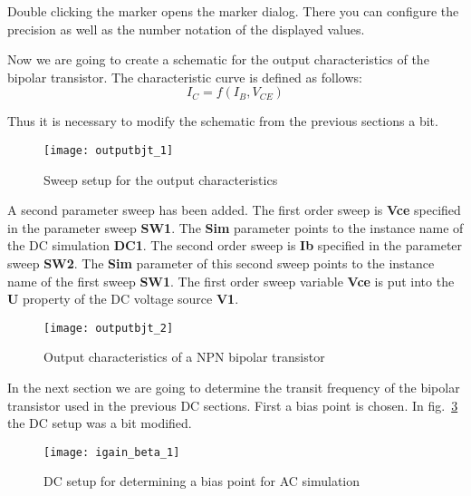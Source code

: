 Double clicking the marker opens the marker dialog.  There you can
configure the precision as well as the number notation of the
displayed values.


Now we are going to create a schematic for the output characteristics
of the bipolar transistor.  The characteristic curve is defined as
follows:
\begin{equation*}
I_{C} = f\left(I_B, V_{CE}\right)
\end{equation*}

Thus it is necessary to modify the schematic from the previous
sections a bit.

\begin{figure}[ht]
  \centering
  \texttt{[image: outputbjt\_1]}
  \caption{Sweep setup for the output characteristics}
  \label{fig:outputbjt_1}
\end{figure}
\FloatBarrier

A second parameter sweep has been added.  The first order sweep is
\textbf{Vce} specified in the parameter sweep \textbf{SW1}.  The
\textbf{Sim} parameter points to the instance name of the DC
simulation \textbf{DC1}.  The second order sweep is \textbf{Ib}
specified in the parameter sweep \textbf{SW2}. The \textbf{Sim}
parameter of this second sweep points to the instance name of the
first sweep \textbf{SW1}.  The first order sweep variable \textbf{Vce}
is put into the \textbf{U} property of the DC voltage source
\textbf{V1}.

\begin{figure}[ht]
  \centering
  \texttt{[image: outputbjt\_2]}
  \caption{Output characteristics of a NPN bipolar transistor}
  \label{fig:outputbjt_2}
\end{figure}
\FloatBarrier


In the next section we are going to determine the transit frequency of
the bipolar transistor used in the previous DC sections.  First a bias
point is chosen.  In fig.~\ref{fig:igain_beta_1} the DC setup was a
bit modified.

\begin{figure}[ht]
  \centering
  \texttt{[image: igain\_beta\_1]}
  \caption{DC setup for determining a bias point for AC simulation}
  \label{fig:igain_beta_1}
\end{figure}
\FloatBarrier

